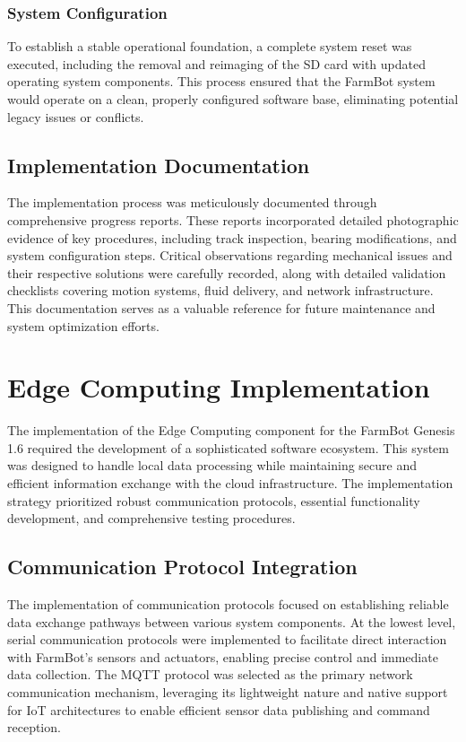 \subsubsection{System Configuration}
To establish a stable operational foundation, a complete system reset was executed, including the removal and reimaging of the SD card with updated operating system components. This process ensured that the FarmBot system would operate on a clean, properly configured software base, eliminating potential legacy issues or conflicts.

\subsection{Implementation Documentation}
The implementation process was meticulously documented through comprehensive progress reports. These reports incorporated detailed photographic evidence of key procedures, including track inspection, bearing modifications, and system configuration steps. Critical observations regarding mechanical issues and their respective solutions were carefully recorded, along with detailed validation checklists covering motion systems, fluid delivery, and network infrastructure. This documentation serves as a valuable reference for future maintenance and system optimization efforts.

\section{Edge Computing Implementation}

The implementation of the Edge Computing component for the FarmBot Genesis 1.6 required the development of a sophisticated software ecosystem. This system was designed to handle local data processing while maintaining secure and efficient information exchange with the cloud infrastructure. The implementation strategy prioritized robust communication protocols, essential functionality development, and comprehensive testing procedures.

\subsection{Communication Protocol Integration}
The implementation of communication protocols focused on establishing reliable data exchange pathways between various system components. At the lowest level, serial communication protocols were implemented to facilitate direct interaction with FarmBot's sensors and actuators, enabling precise control and immediate data collection. The MQTT protocol was selected as the primary network communication mechanism, leveraging its lightweight nature and native support for IoT architectures to enable efficient sensor data publishing and command reception.

